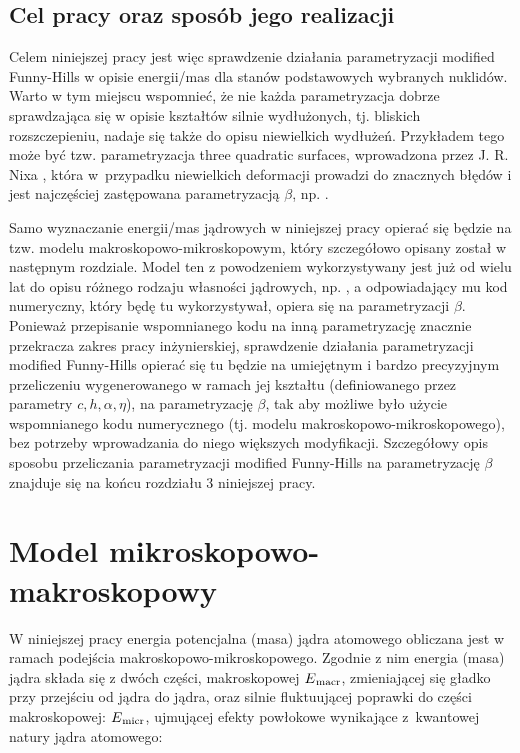 \documentclass[a4paper,polish]{article}
\numberwithin{equation}{section}
\begin{document}
\clearpage
\subsection{Cel pracy oraz sposób jego realizacji}

Celem niniejszej pracy jest więc sprawdzenie działania parametryzacji modified Funny-Hills w opisie energii/mas dla stanów podstawowych wybranych nuklidów. Warto w tym miejscu wspomnieć, że nie każda parametryzacja dobrze sprawdzająca się w opisie kształtów silnie wydłużonych, tj. bliskich rozszczepieniu, nadaje się także do opisu niewielkich wydłużeń. Przykładem tego może być tzw. parametryzacja three quadratic surfaces, wprowadzona przez J. R. Nixa \cite{NIX}, która w~przypadku niewielkich deformacji prowadzi do znacznych błędów i jest najczęściej zastępowana parametryzacją $\beta$, np. \cite{Moll2009}.

Samo wyznaczanie energii/mas jądrowych w niniejszej pracy opierać się będzie na tzw. modelu makroskopowo-mikroskopowym, który szczegółowo opisany został w następnym rozdziale. Model ten z powodzeniem wykorzystywany jest już od wielu lat do opisu różnego rodzaju własności jądrowych, np. \cite{JACHQ,JACHBF,Muntian}, a odpowiadający mu kod numeryczny, który będę tu wykorzystywał, opiera się na parametryzacji $\beta$. Ponieważ przepisanie wspomnianego kodu na inną parametryzację znacznie przekracza zakres pracy inżynierskiej, sprawdzenie działania parametryzacji modified Funny-Hills opierać się tu będzie na umiejętnym i bardzo precyzyjnym przeliczeniu wygenerowanego w ramach jej kształtu (definiowanego przez parametry $c, h, \alpha, \eta$),  na parametryzację $\beta$, tak aby możliwe było użycie wspomnianego kodu numerycznego (tj. modelu makroskopowo-mikroskopowego), bez potrzeby wprowadzania do niego większych modyfikacji. Szczegółowy opis sposobu przeliczania parametryzacji modified Funny-Hills na parametryzację $\beta$ znajduje się na końcu rozdziału 3 niniejszej pracy.

\section{Model mikroskopowo-makroskopowy}

W niniejszej pracy energia potencjalna (masa) jądra atomowego obliczana jest w ramach podejścia makroskopowo-mikroskopowego. Zgodnie z nim energia (masa) jądra składa się z dwóch części, makroskopowej $E\textsubscript{macr}$, zmieniającej się gładko przy przejściu od jądra do jądra, oraz silnie fluktuującej poprawki do części makroskopowej: $E\textsubscript{micr}$, ujmującej efekty powłokowe wynikające z~kwantowej natury jądra atomowego: 
\end{document}
